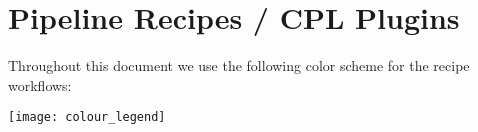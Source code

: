 \clearpage

\section{Pipeline Recipes / CPL Plugins}
\label{sec:pipeline_recipes}

Throughout this document we use the following color scheme for the
recipe workflows:
\begin{center}
  \texttt{[image: colour\_legend]}
\end{center}









